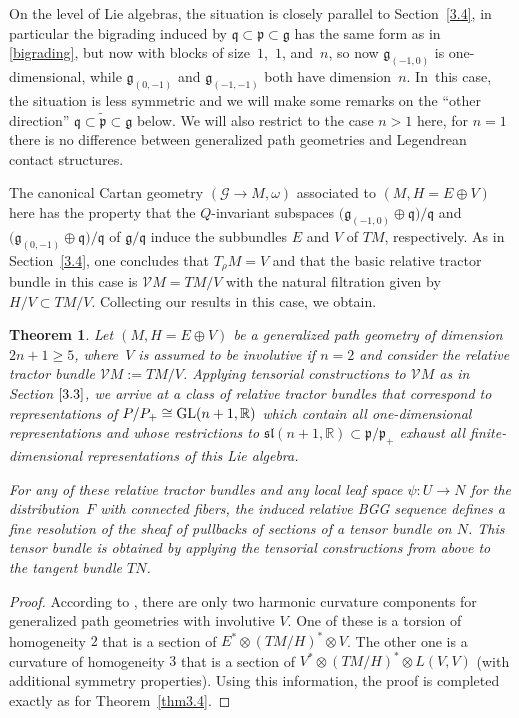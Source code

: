 \documentclass[10pt,a4paper]{amsart}
\numberwithin{equation}{section}
\newtheorem{Theorem}{Theorem}[section]
\def\frak{\mathfrak}
\def\Bbb{\mathbb}
\def\Cal{\mathcal}
\newcommand{\om}{\omega}
\begin{document}
On the level of Lie algebras, the situation is closely parallel to Section~\ref{3.4}, in
particular the bigrading induced by $\frak q\subset\frak p\subset\frak g$ has the
same form as in \eqref{bigrading}, but now with blocks of size~$1$,~$1$, and~$n$, so
now $\frak g_{(-1,0)}$ is one-dimensional, while $\frak g_{(0,-1)}$ and
$\frak g_{(-1,-1)}$ both have dimension~$n$. In~this case, the situation is less
symmetric and we will make some remarks on the ``other direction'' $\frak
q\subset\tilde{\frak p}\subset\frak g$ below. We will also restrict to the case $n>1$
here, for $n=1$ there is no difference between generalized path geometries and
Legendrean contact structures.

The canonical Cartan geometry $(\Cal G\to M,\om)$ associated to $(M,H=E\oplus V)$
here has the property that the $Q$-invariant subspaces
$\bigl(\frak g_{(-1,0)}\oplus\frak q\bigr)/\frak q$ and
$\bigl(\frak g_{(0,-1)}\oplus\frak q\bigr)/\frak q$ of $\frak g/\frak q$ induce the subbundles
$E$ and $V$ of $TM$, respectively. As in Section~\ref{3.4}, one concludes that $T_\rho M=V$
and that the basic relative tractor bundle in this case is $\Cal VM=TM/V$ with the
natural filtration given by $H/V\subset TM/V$. Collecting our results in this case,
we obtain.


\begin{Theorem}\label{thm3.5}
 Let $(M,H=E\oplus V)$ be a generalized path geometry of dimension $2n+1\geq 5$,
 where~$V$ is assumed to be involutive if $n=2$ and consider the relative tractor
 bundle $\Cal VM:=TM/V$. Applying tensorial constructions to $\Cal VM$ as in Section
 $\ref{3.3}$, we arrive at a class of relative tractor bundles that correspond to
 representations of $P/P_+\cong {\rm GL}(n+1,\Bbb R)$ which contain all one-dimensional
 representations and whose restrictions to
 $\frak{sl}(n+1,\Bbb R)\subset\frak p/\frak p_+$ exhaust all finite-dimensional
 representations of this Lie algebra.

 For any of these relative tractor bundles and any local leaf space $\psi\colon U\to N$ for
 the distribution~$F$ with connected fibers, the induced relative BGG sequence
 defines a fine resolution of the sheaf of pullbacks of sections of a tensor bundle
 on $N$. This tensor bundle is obtained by applying the tensorial constructions from
 above to the tangent bundle $TN$.
\end{Theorem}

\begin{proof}
 According to \cite[Section 4.4.3]{book}, there are only two harmonic curvature
 components for generalized path geometries with involutive $V$. One of these is a
 torsion of homogeneity $2$ that is a section of $E^*\otimes (TM/H)^*\otimes V$. The
 other one is a curvature of homogeneity $3$ that is a section of $V^*\otimes
 (TM/H)^*\otimes L(V,V)$ (with additional symmetry properties). Using this
 information, the proof is completed exactly as for Theorem~\ref{thm3.4}.
\end{proof}
\end{document}
